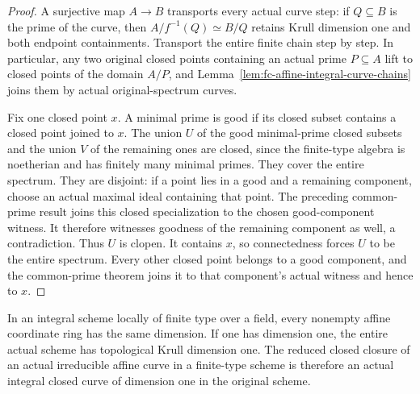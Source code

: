 \begin{proof}
A surjective map $A\to B$ transports every actual curve step: if $Q\subseteq B$ is the prime
of the curve, then $A/f^{-1}(Q)\simeq B/Q$ retains Krull dimension one and both endpoint containments.
Transport the entire finite chain step by step. In particular, any two original closed points containing
an actual prime $P\subseteq A$ lift to closed points of the domain $A/P$, and
Lemma~\ref{lem:fc-affine-integral-curve-chains} joins them by actual original-spectrum curves.

Fix one closed point $x$. A minimal prime is good if its closed subset contains a closed point
joined to $x$. The union $U$ of the good minimal-prime closed subsets and the union $V$ of the
remaining ones are closed, since the finite-type algebra is noetherian and has finitely many minimal primes.
They cover the entire spectrum. They are disjoint: if a point lies in a good and a remaining
component, choose an actual maximal ideal containing that point. The preceding common-prime result joins
this closed specialization to the chosen good-component witness. It therefore witnesses goodness of
the remaining component as well, a contradiction. Thus $U$ is clopen. It contains $x$, so connectedness
forces $U$ to be the entire spectrum. Every other closed point belongs to a good component, and the
common-prime theorem joins it to that component's actual witness and hence to $x$.
\end{proof}

\begin{lemma}\label{lem:fc-scheme-curve-dimensions}
\leanok
{}
In an integral scheme locally of finite type over a field, every nonempty affine coordinate ring has
the same dimension. If one has dimension one, the entire actual scheme has topological Krull dimension one.
The reduced closed closure of an actual irreducible affine curve in a finite-type scheme is therefore
an actual integral closed curve of dimension one in the original scheme.
\end{lemma}

